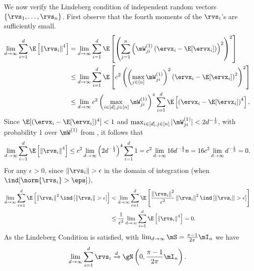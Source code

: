 \begin{proofof}{}
We now verify the Lindeberg condition of independent random vectors $\{\rvs_1,\ldots, \rvs_n\}$.
First observe that the fourth moments of the $\rvs_i$'s are sufficiently small.
\begin{equation}
\begin{split}
    \lim_{d\to\infty}\sum_{i=1}^d\E\left[\left\Vert\rvs_i\right\Vert^4\right] &= \lim_{d\to\infty}\sum_{i=1}^d\E\left[\left(\sum_{j=1}^n \left(\mW^{(1)}_{ji}\left(\ervx_i - \E[\ervx_i]\right)\right)^2\right)^2\right]\\
    & \leq\lim_{d\to\infty} \sum_{i=1}^d\E\left[c^2\left(\left(\max_{j\in[n]}\mW^{(1)}_{ji}\right)^2\left(\ervx_i - \E[\ervx_i]\right)^2\right)^2\right]\\
    & \leq\lim_{d\to\infty} c^2\left(\max_{i\in[d],j\in[n]}\mW^{(1)}_{ji}\right)^4\sum_{i=1}^d\E\left[\left(\ervx_i - \E[\ervx_i]\right)^4\right].
\end{split}
\end{equation}
Since $\E[(\ervx_i - \E[\ervx_i])^4] < 1$ and $\max_{i\in[d],j\in[n]}|\mW^{(1)}_{ji}| < 2d^{-\frac13}$, with probability 1 over $\mW^{(1)}$ from , it follows that
\begin{equation}
\begin{split}
    \lim_{d\to\infty}\sum_{i=1}^d\E\left[\left\Vert\rvs_i\right\Vert^4\right] \leq c^2\lim_{d\to\infty}\left(2d^{-\frac13}\right)^4\sum_{i=1}^d 1 = c^2 \lim_{d\to\infty}16d^{-\frac43}n =  16c^2 \lim_{d\to\infty}d^{-\frac13} =0.
\end{split}
\end{equation}
For any $\epsilon > 0$, since $\left\Vert\rvs_{i}\right\Vert > \epsilon$ in the domain of integration (when $\ind[\norm{\rvs_i} > \eps]$),
\begin{equation}
\begin{split}
\lim_{d\to\infty}\sum_{i=1}^d\E\left[\left\Vert\rvs_i\right\Vert^2\ind\left[\left\Vert\rvs_{i}\right\Vert > \epsilon\right]\right] & < \lim_{d\to\infty}\sum_{i=1}^d\E\left[\frac{\left\Vert\rvs_i\right\Vert^2}{\epsilon^2}\left\Vert\rvs_i\right\Vert^2\ind\left[\left\Vert\rvs_{i}\right\Vert > \epsilon\right]\right]\\
&\leq \frac{1}{\epsilon^2}\lim_{d\to\infty}\sum_{i=1}^d\E\left[\left\Vert\rvs_i\right\Vert^4\right] = 0.
\end{split}
\end{equation}
As the Lindeberg Condition is satisfied, with $\lim_{d\to\infty}\mS = \frac{\pi-1}{2\pi}\mI_n$ we have
\begin{equation}
\label{eqn:lemma:sumv-convergence-w1}
    \lim_{d\to\infty}\sum_{i=1}^d\rvs_i\xrightarrow{d}\gN\left(0,\frac{\pi-1}{2\pi}\mI_n\right).
\end{equation}


\end{proofof}
